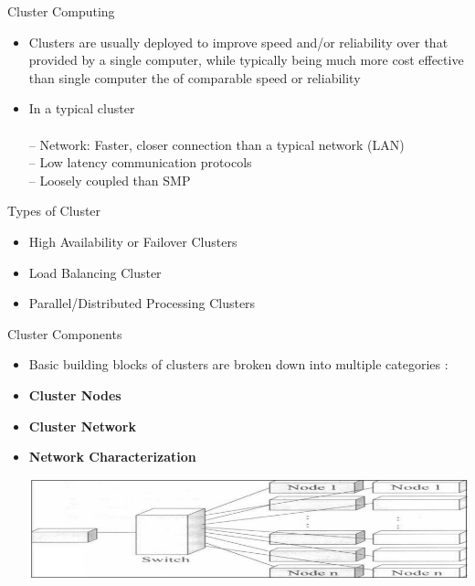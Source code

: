 \documentclass{SKP-beamer}
\begin{document}
\begin{frame}{ Cluster Computing}
	\begin{itemize}
		
		\item   Clusters are usually deployed to improve speed and/or reliability 
		over that provided by a single computer, while typically being 
		much more cost effective than single computer the of comparable 
		speed or reliability
		\item In a typical cluster \\ \\
		– Network: Faster, closer connection than a typical 
		network (LAN) \\
		– Low latency communication protocols \\
		– Loosely coupled than SMP
		
		
		
		
	\end{itemize}
\end{frame}


\begin{frame}{Types of Cluster}
	\begin{itemize}
		
		\item High Availability or Failover Clusters
		\item Load Balancing Cluster
		\item Parallel/Distributed Processing 
		Clusters
		
		
	\end{itemize}
\end{frame}


\begin{frame}{Cluster Components}
	\begin{itemize}
		
		\item Basic building blocks of clusters are broken down into 
		multiple categories :
		\item \textbf{Cluster Nodes}
		\item \textbf{Cluster Network}
		\item \textbf{Network Characterization}
		
			\includegraphics[scale=0.5]{7.png}
		
		
	\end{itemize}
\end{frame}
\end{document}
